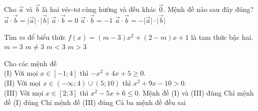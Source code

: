 \begin{ex}%
Cho $\overrightarrow{a} $ và $\overrightarrow{b} $ là hai véc-tơ cùng hướng và đều khác $\overrightarrow{0} $. Mệnh đề nào sau đây đúng?
\choice
{\True $\overrightarrow{a} \cdot \overrightarrow{b}=\big| \overrightarrow{a}\big| \cdot \big| \overrightarrow{b}\big| $}
{$\overrightarrow{a} \cdot \overrightarrow{b}=0$}
{$\overrightarrow{a} \cdot \overrightarrow{b}=-1$}
{$\overrightarrow{a} \cdot \overrightarrow{b}=-\big| \overrightarrow{a}\big| \cdot \big| \overrightarrow{b}\big| $}
\end{ex}

\begin{ex}%
Tìm $m$ để biểu thức $f(x)=(m-3) x^2+(2-m) x+1$ là tam thức bậc hai.
\choice
{$m=3$}
{\True $m \neq 3$}
{$m<3$}
{$m>3$}
\end{ex}


\begin{ex}%
Cho các mệnh đề\\
(I) Với mọi $x \in [-1;4]$ thì $-x^2+4x+5 \geq 0$.\\
(II) Với mọi $x \in (-\infty;4) \cup (5;10)$ thì $x^2+9x-10>0$. \\
(III) Với mọi $x \in [2;3]$ thì $x^2-5x+6 \leq 0$.
\choice
{\True Mệnh đề (I) và (III) đúng}
{Chỉ mệnh đề (I) đúng}
{Chỉ mệnh đề (III) đúng}
{Cả ba mệnh đề đều sai}
\end{ex}

